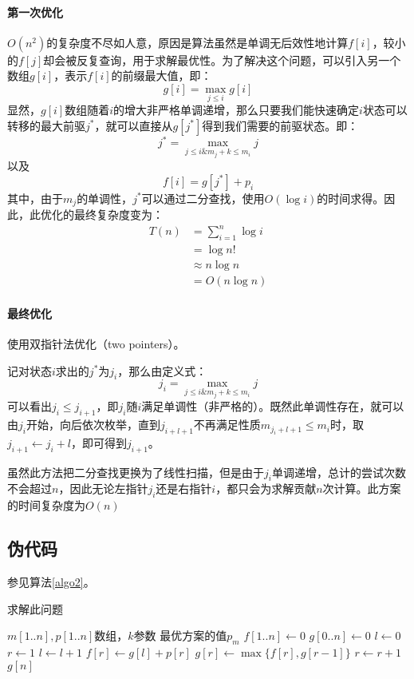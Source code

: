\documentclass[UTF8]{ctexart}
\begin{document}
        \paragraph*{第一次优化}
        $O(n^2)$的复杂度不尽如人意，原因是算法虽然是单调无后效性地计算$f[i]$，较小的$f[j]$却会被反复查询，用于求解最优性。为了解决这个问题，可以引入另一个数组$g[i]$，表示$f[i]$的前缀最大值，即：
        $$g[i] = \max_{j\leq i}{g[i]}$$
        显然，$g[i]$数组随着$i$的增大非严格单调递增，那么只要我们能快速确定$i$状态可以转移的最大前驱$j^*$，就可以直接从$g[j^*]$得到我们需要的前驱状态。即：
        $$j^* = \max_{j\leq i \& m_j+k \leq m_i}{j}$$
        以及
        $$f[i] = g[j^*] + p_i$$
        其中，由于$m_j$的单调性，$j^*$可以通过二分查找，使用$O(\log i)$的时间求得。因此，此优化的最终复杂度变为：
        \begin{align*}
            T(n)
            &= \sum_{i=1}^{n}{\log i} \\
            &= \log{n!} \\
            &\approx n\log n\\
            &= O(n\log n)
        \end{align*}

        \paragraph*{最终优化}
        使用双指针法优化（two pointers）。

        记对状态$i$求出的$j^*$为$j_i$，那么由定义式：
        $$j_i = \max_{j\leq i \& m_j+k \leq m_i}{j}$$
        可以看出$j_i \leq j_{i+1}$，即$j_i$随$i$满足单调性（非严格的）。既然此单调性存在，就可以由$j_i$开始，向后依次枚举，直到$j_{i+l+1}$不再满足性质$m_{j_{i}+l+1} \leq m_i$时，取$j_{i+1} \gets j_{i}+l$，即可得到$j_{i+1}$。

        虽然此方法把二分查找更换为了线性扫描，但是由于$j_{i}$单调递增，总计的尝试次数不会超过$n$，因此无论左指针$j_i$还是右指针$i$，都只会为求解贡献$n$次计算。此方案的时间复杂度为$O(n)$

    \subsection*{伪代码}
    参见算法\ref{algo2}。
    \begin{algorithm}
        \caption{求解此问题}
        \begin{algorithmic}[1]
            \Require $m[1..n], p[1..n]$数组，$k$参数
            \Ensure 最优方案的值$p_m$
                \State $f[1..n]\gets 0$
                \State $g[0..n]\gets 0$
                \State $l \gets 0$
                \State $r \gets 1$
                        \State $l\gets l+1$
                    \EndWhile
                    \State $f[r] \gets g[l]+p[r]$
                    \State $g[r] \gets \max{\{f[r], g[r-1]\}}$
                    \State $r\gets r+1$
                \EndWhile
                \State \Return $g[n]$
            \EndFunction
        \end{algorithmic}
        \label{algo2}
    \end{algorithm}
\end{document}
